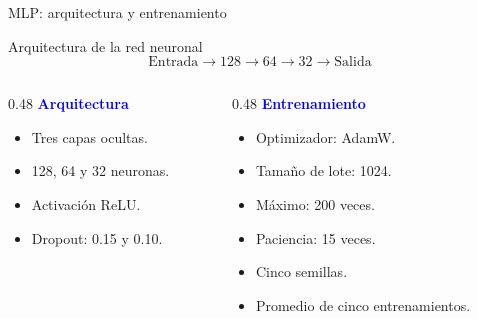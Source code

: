 \documentclass[12pt, aspectratio=43]{beamer}
\begin{document}
\begin{frame}{MLP: arquitectura y entrenamiento}

\begin{center}

\begin{block}{Arquitectura de la red neuronal}
\[
\boxed{
\text{Entrada}
\longrightarrow 128
\longrightarrow 64
\longrightarrow 32
\longrightarrow \text{Salida}
}
\]
\end{block}

\end{center}

\begin{columns}[T,onlytextwidth]

\begin{column}{0.48\textwidth}
\textbf{\textcolor{blue}{Arquitectura}}

\begin{itemize}
    \item Tres capas ocultas.
    \item 128, 64 y 32 neuronas.
    \item Activación ReLU.
    \item Dropout: 0.15 y 0.10.
\end{itemize}
\end{column}

\begin{column}{0.48\textwidth}
\textbf{\textcolor{blue}{Entrenamiento}}

\begin{itemize}
    \item Optimizador: AdamW.
    \item Tamaño de lote: 1024.
    \item Máximo: 200 veces.
    \item Paciencia: 15 veces.
    \item Cinco semillas.
    \item Promedio de cinco entrenamientos.
\end{itemize}
\end{column}

\end{columns}


\end{frame}
\end{document}
